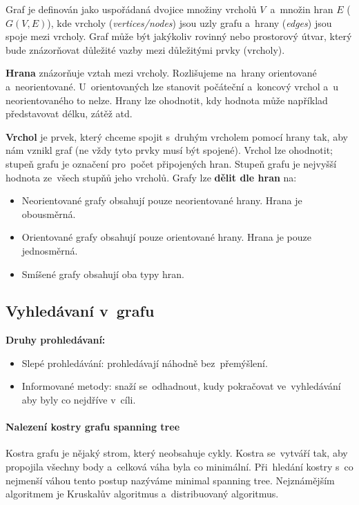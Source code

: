 Graf je definován jako uspořádaná dvojice množiny vrcholů $V$~a~množin hran $E$ ($G(V,E)$), kde vrcholy (\emph{vertices/nodes}) jsou uzly grafu a~hrany (\emph{edges}) jsou spoje mezi vrcholy. Graf může být jakýkoliv rovinný nebo prostorový útvar, který bude znázorňovat důležité vazby mezi důležitými prvky (vrcholy).

\textbf{Hrana} znázorňuje vztah mezi vrcholy. Rozlišujeme na~hrany orientované a~neorientované. U~orientovaných lze stanovit počáteční a~koncový vrchol a~u neorientovaného to nelze. Hrany lze ohodnotit, kdy hodnota může například představovat délku, zátěž atd.

\textbf{Vrchol} je prvek, který chceme spojit s~druhým vrcholem pomocí hrany tak, aby nám vznikl graf (ne vždy tyto prvky musí být spojené). Vrchol lze ohodnotit; stupeň grafu je označení pro~počet připojených hran. Stupeň grafu je nejvyšší hodnota ze~všech stupňů jeho vrcholů. Grafy lze \textbf{dělit dle hran} na:

\begin{itemize}[noitemsep]
	\item Neorientované grafy obsahují pouze neorientované hrany. Hrana je obousměrná.
	\item Orientované grafy obsahují pouze orientované hrany. Hrana je pouze jednosměrná.
	\item Smíšené grafy obsahují oba typy hran.
\end{itemize}

\subsection{Vyhledávaní v~grafu}

\textbf{Druhy prohledávaní:}
\begin{itemize}[noitemsep]
	\item Slepé prohledávání: prohledávají náhodně bez~přemýšlení.
	\item Informované metody: snaží se~odhadnout, kudy pokračovat ve~vyhledávání aby byly co nejdříve v~cíli.
\end{itemize}

\paragraph{Nalezení kostry grafu spanning tree} Kostra grafu je nějaký strom, který neobsahuje cykly. Kostra se~vytváří tak, aby propojila všechny body a~celková váha byla co minimální. Při~hledání kostry s~co nejmenší váhou tento postup nazýváme minimal spanning tree. Nejznámějším algoritmem je Kruskalův algoritmus a~distribuovaný algoritmus.

